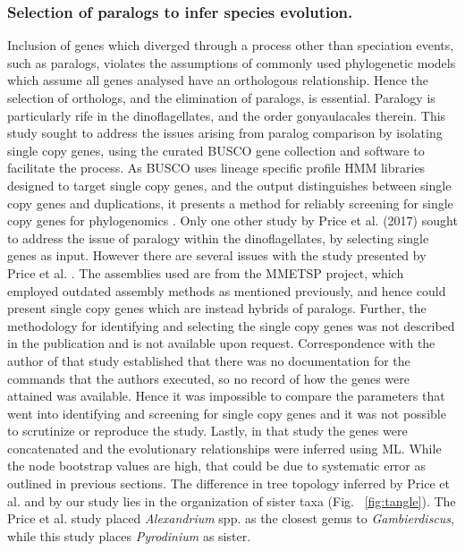 \documentclass[12pt]{article}
\begin{document}
\subsubsection{Selection of paralogs to infer species evolution.}
\FloatBarrier
Inclusion of genes which diverged through a process other than speciation events, such as paralogs, violates the assumptions of commonly used phylogenetic models which assume all genes analysed have an orthologous relationship.
Hence the selection of orthologs, and the elimination of paralogs, is essential.
Paralogy is particularly rife in the dinoflagellates, and the order gonyaulacales therein. 
This study sought to address the issues arising from paralog comparison by isolating single copy genes, using the curated BUSCO gene collection and software to facilitate the process. 
As BUSCO uses lineage specific profile HMM libraries designed to target single copy genes, and the output distinguishes between single copy genes and duplications, it presents a method for reliably screening for single copy genes for phylogenomics \cite{waterhouse2017busco}.
Only one other study by Price et al. (2017) sought to address the issue of paralogy within the dinoflagellates, by selecting single genes as input. 
However there are several issues with the study presented by Price et al. \cite{price2017robust}. 
The assemblies used are from the MMETSP project, which employed outdated assembly methods as mentioned previously, and hence could present single copy genes which are instead hybrids of paralogs. 
Further, the methodology for identifying and selecting the single copy genes was not described in the publication and is not available upon request. 
Correspondence with the author of that study established that there was no documentation for the commands that the authors executed, so no record of how the genes were attained was available. 
Hence it was impossible to compare the parameters that went into identifying and screening for single copy genes and it was not possible to scrutinize or reproduce the study.
Lastly, in that study the genes were concatenated and the evolutionary relationships were inferred using ML. 
While the node bootstrap values are high, that could be due to systematic error as outlined in previous sections.
The difference in tree topology inferred by Price et al. and by our study lies in the organization of sister taxa (Fig. ~\ref{fig:tangle}). 
The Price et al. study placed \emph{Alexandrium} spp. as the closest genus to \emph{Gambierdiscus}, while this study places \emph{Pyrodinium} as sister. 
\end{document}
